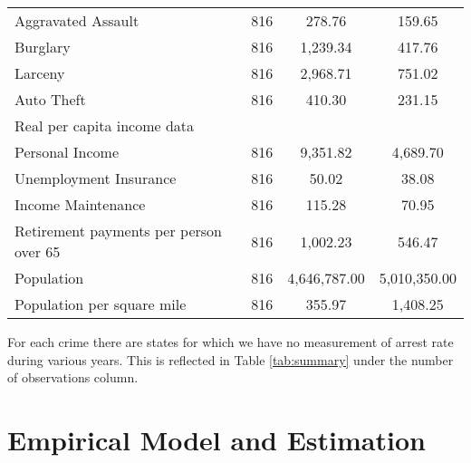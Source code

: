 \documentclass{article}
\begin{document}
\begin{table}[H]
\begin{tabular}[h]{@{\extracolsep{5pt}}lccc}
\hspace{3mm}Aggravated Assault & 816 & 278.76 & 159.65 \\ 
\hspace{3mm}Burglary & 816 & 1,239.34 & 417.76 \\ 
\hspace{3mm}Larceny & 816 & 2,968.71 & 751.02 \\ 
\hspace{3mm}Auto Theft & 816 & 410.30 & 231.15 \\ 
Real per capita income data &&&\\
\hspace{3mm}Personal Income & 816 & 9,351.82 & 4,689.70 \\ 
\hspace{3mm}Unemployment Insurance & 816 & 50.02 & 38.08 \\ 
\hspace{3mm}Income Maintenance & 816 & 115.28 & 70.95 \\ 
\hspace{3mm}Retirement payments per person over 65 & 816 & 1,002.23 & 546.47 \\ 
Population & 816 & 4,646,787.00 & 5,010,350.00 \\ 
Population per square mile & 816 & 355.97 & 1,408.25 \\ 
\bottomrule
\end{tabular} 
\end{table} 

For each crime there are states for which we have no measurement of arrest rate during various years. This is reflected in Table \ref{tab:summary} under the number of observations column.
\newpage
\section*{Empirical Model and Estimation}
\end{document}
